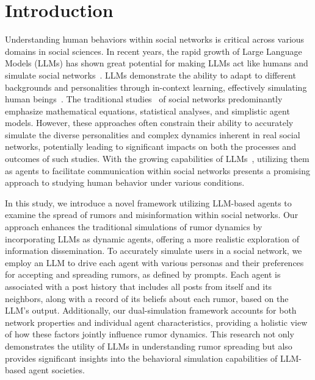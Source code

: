 \vspace{-2ex}
\section{Introduction}
\label{sec:into_motiv}

Understanding human behaviors within social networks is critical across various domains in social sciences. 
In recent years, the rapid growth of Large Language Models (LLMs) has shown great potential for making LLMs act like humans and simulate social networks~\cite{chen2024scalablemultirobotcollaborationlarge}. 
LLMs demonstrate the ability to adapt to different backgrounds and personalities through in-context learning, effectively simulating human beings~\cite{chuang2024simulatingopiniondynamicsnetworks}. 
The traditional studies~\cite{hamidian2019rumordetectionclassificationtwitter,kaligotla2015agent} of social networks predominantly emphasize mathematical equations, statistical analyses, and simplistic agent models. 
However, these approaches often constrain their ability to accurately simulate the diverse personalities and complex dynamics inherent in real social networks, potentially leading to significant impacts on both the processes and outcomes of such studies. 
With the growing capabilities of LLMs~\cite{radford2018improving}, utilizing them as agents to facilitate communication within social networks presents a promising approach to studying human behavior under various conditions.

In this study, we introduce a novel framework utilizing LLM-based agents to examine the spread of rumors and misinformation within social networks.
Our approach enhances the traditional simulations of rumor dynamics by incorporating LLMs as dynamic agents, offering a more realistic exploration of information dissemination.
To accurately simulate users in a social network, we employ an LLM to drive each agent with various personas and their preferences for accepting and spreading rumors, as defined by prompts.
Each agent is associated with a post history that includes all posts from itself and its neighbors, along with a record of its beliefs about each rumor, based on the LLM's output.
Additionally, our dual-simulation framework accounts for both network properties and individual agent characteristics, providing a holistic view of how these factors jointly influence rumor dynamics.
This research not only demonstrates the utility of LLMs in understanding rumor spreading but also provides significant insights into the behavioral simulation capabilities of LLM-based agent societies.